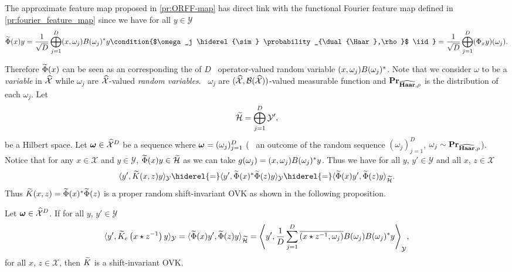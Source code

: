 \begin{remark}
The approximate feature map proposed in \cref{pr:ORFF-map} has direct link with the functional Fourier feature map defined in \cref{pr:fourier_feature_map} since we have for all $y\in\mathcal{Y}$
\begin{dmath}
\tildePhi{\omega}(x)y = \frac{1}{\sqrt{D}}\Vect_{j=1}^D\pairing{x, \omega_j}B(\omega_j)^\adjoint y \condition{$\omega_j \hiderel{\sim} \probability_{\dual{\Haar},\rho}$ \iid}
= \frac{1}{\sqrt{D}} \Vect_{j=1}^D (\Phi_x y)(\omega_j).
\end{dmath}
\end{remark}
Therefore $\widetilde{\Phi}(x)$ can be seen as an  corresponding the  of $D$ \iid~operator-valued random variable $(x, \omega_j)B(\omega_j)^*$. Note that we consider $\omega$ to be a \emph{variable} in $\widehat{\mathcal{X}}$ while $\omega_j$ are $\widehat{\mathcal{X}}$-valued \emph{random variables}. \Ie~$\omega_j$ are $(\widehat{\mathcal{X}}, \mathcal{B}(\widehat{\mathcal{X}}))$-valued measurable function and ${\mathbf{{Pr}}}_{\widehat{\mathbf{Haar}},\rho}$ is the distribution of each $\omega_j$. Let
\begin{dmath*}
\tildeH{\omega} = \Vect_{j=1}^D\mathcal{Y}',
\end{dmath*}
be a Hilbert space. Let $\boldsymbol{\mathbf{\omega}}\in\widehat{\mathcal{X}}^D$ be a sequence where $\boldsymbol{\mathbf{\omega}}=(\omega_j)_{j=1}^D$ (\ie~ an outcome of the random sequence $(\omega_j)_{j=1}^D$, $\omega_j \sim {\mathbf{{Pr}}}_{\widehat{\mathbf{Haar}},\rho}$). Notice that for any $x\in\mathcal{X}$ and $y\in\mathcal{Y}$, $\widetilde{\Phi}(x)y\in\widetilde{\mathcal{H}}$ as we can take $g(\omega_j)=(x,\omega_j)B(\omega_j)^* y$. Thus we have for all $y$, $y'\in\mathcal{Y}$ and all $x$, $z\in\mathcal{X}$
\begin{dmath*}
\inner{y', \tildeK{\omega}(x, z)y}_{\mathcal{Y}} \hiderel{=} \inner{y', \tildePhi{\omega}(x)^\adjoint \tildePhi{\omega}(z)y}_{\mathcal{Y}} \hiderel{=} \inner{\tildePhi{\omega}(x)y', \tildePhi{\omega}(z)y}_{\tildeH{\omega}}.
\end{dmath*}
Thus $\widetilde{K}(x,z)=\widetilde{\Phi}(x)^* \widetilde{\Phi}(z)$ is a proper random shift-invariant \acl{OVK} as shown in the following proposition.
\begin{proposition} Let $\boldsymbol{\mathbf{\omega}}\in\widehat{\mathcal{X}}^D$. If for all $y$, $y'\in\mathcal{Y}$
\begin{dmath*}
\inner{y', \tildeK{\omega}_e\left(x\groupop z^{-1}\right)y}_{\mathcal{Y}}=\inner{\tildePhi{\omega}(x)y', \tildePhi{\omega}(z)y}_{\tildeH{\omega}}
=\inner*{y', \frac{1}{D}\sum_{j=1}^D \conj{\pairing{x\groupop z^{-1},\omega_j}}B(\omega_j)B(\omega_j)^*y}_{\mathcal{Y}},
\end{dmath*}
for all $x$,  $z\in\mathcal{X}$, then $\widetilde{K}$ is a shift-invariant \acl{OVK}.
\end{proposition}

